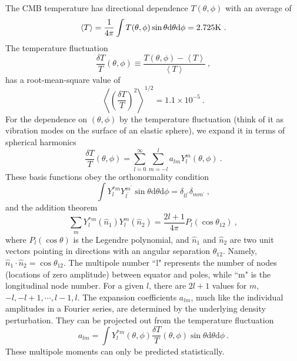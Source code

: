 \documentclass[12pt,a4paper]{article}
\newcommand{\dif}{\mathrm{d}}
\begin{document}
\cite{cheng2005relativity} The CMB temperature has directional dependence $T(\theta, \phi)$ with an average of
\begin{equation}
\left\langle T \right\rangle = \dfrac{1}{4\pi} \int T(\theta, \phi) \sin \theta \dif \theta \dif \phi = 2.725 \rm K ~.
\end{equation}
The temperature fluctuation
\begin{equation}
\dfrac{\delta T}{T}(\theta, \phi) \equiv \dfrac{T(\theta, \phi) -\left\langle T \right\rangle}{\left\langle T \right\rangle} ~,
\end{equation}
has a root-mean-square value of
\begin{equation}
\left\langle \left(\dfrac{\delta T}{T} \right)^2 \right\rangle^{1/2} = 1.1 \times 10^{-5} ~.
\end{equation}
For the dependence on $(\theta, \phi)$ by the temperature fluctuation (think of it as vibration modes on the surface of an elastic sphere), we expand it in terms of spherical harmonics
\begin{equation}
\dfrac{\delta T}{T}(\theta, \phi) = \sum_{l=0}^\infty\sum_{m=-l}^l a_{lm} Y_l^m(\theta, \phi) ~.
\end{equation}
These basis functions obey the orthonormality condition
\begin{equation}
\int Y_l^{ \ast m} Y_{l^\prime}^{m^\prime} \sin \theta \dif \theta \dif \phi = \delta_{ll^\prime} \delta_{mm^\prime} ~,
\end{equation}
and the addition theorem
\begin{equation}
\sum_m Y_l^{\ast m}(\hat{n}_1) Y_l^{m}(\hat{n}_2)  = \dfrac{2l+1}{4\pi} P_l(\cos \theta_{12}) ~,
\end{equation}
where $P_l(\cos \theta)$ is the Legendre polynomial, and $\hat{n}_1$ and $\hat{n}_2$ are two unit vectors pointing in directions with an angular separation $\theta_{12}$. Namely, $\hat{n}_1 \cdot \hat{n}_2 = \cos \theta_{12}$. The multipole number ``l" represents the number of nodes (locations of zero amplitude) between equator and poles, while ``m" is the longitudinal node number. For a given $l$, there are $2l + 1$ values for $m$, $-l, -l +1, \cdots, l-1, l$. The expansion coefficients $a_{lm}$, much like the individual amplitudes in a Fourier series, are determined by the underlying density perturbation. They can be projected out from the temperature fluctuation 
\begin{equation}
a_{lm} = \int  Y_l^{ \ast m}(\theta, \phi) \dfrac{\delta T}{T}(\theta, \phi) \sin \theta \dif \theta \dif \phi ~.
\end{equation}
These multipole moments can only be predicted statistically.
\end{document}
